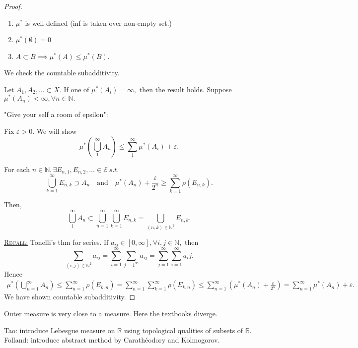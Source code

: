 \documentclass{report}
\newcommand{\R}{\mathbb{R}}
\newcommand{\N}{\mathbb{N}}
\newcommand{\st}{\ s.t.\ }
\newcommand{\fancyem}[1]{\underline{\textsc{#1}}}
\theoremstyle{definition}
\theoremstyle{remark}
\begin{document}
\begin{proof}
\begin{enumerate}
	\item
	$\mu^*$ is well-defined (inf is taken over non-empty set.)
	\item
	$\mu^*(\emptyset) = 0$
	\item
	$A \subset B \implies \mu^*(A) \leq \mu^*(B).$
\end{enumerate}
We check the countable subadditivity.

Let $A_1, A_2, \ldots \subset X.$ If one of $\mu^*(A_i) = \infty,$ then the result holds. Suppose $\mu^*(A_n) < \infty, \forall n \in \N.$

"Give your self a room of epsilon":

Fix $\varepsilon > 0.$ We will show \[\mu^*\left(\bigcup_1^\infty A_n\right) \leq \sum_1^\infty \mu^*(A_i) + \varepsilon.\]

For each $n \in \N, \exists E_{n,1}, E_{n,2}, \ldots \in \mathcal{E} \st$ \[\bigcup_{k=1}^\infty E_{n, k} \supset A_n \quad \text{and} \quad \mu^*(A_n) + \frac{\varepsilon}{2^n}\geq \sum_{k=1}^\infty \rho(E_{n, k}).\]

Then, \[
\bigcup_1^\infty A_n \subset \bigcup_{n=1}^\infty \bigcup_{k=1}^\infty E_{n, k} = \bigcup_{(n, k) \in \N^2} E_{n, k}.
\]

\fancyem{Recall:} Tonelli's thm for series.
If $a_{ij} \in [0, \infty], \forall i, j \in \N, $ then
\[
\sum_{(i, j) \in \N^2} a_{ij} = \sum_{i=1}^\infty\sum_{j=1^\infty} a_{ij} = \sum_{j=1}^\infty\sum_{i=1}^\infty a_ij.
\]
Hence 
\begin{align*}
\mu^*\left(\bigcup_{n=1}^\infty A_n\right) \leq \sum_{n=1}^\infty \rho(E_{k, n}) = \sum_{n=1}^\infty \sum_{k=1}^\infty \rho(E_{k, n}) \leq \sum_{n=1}^\infty\left(\mu^*(A_n) + \frac{\varepsilon}{2^n}\right) = \sum_{n=1}^\infty \mu^*(A_n) + \varepsilon.
\end{align*}
We have shown countable subadditivity.
\end{proof}

Outer measure is very close to a measure. Here the textbooks diverge.

Tao: introduce Lebesgue measure on $\R$ using topological qualities of subsets of $\R.$\\
Folland: introduce abstract method by Carathéodory and Kolmogorov.
\end{document}

